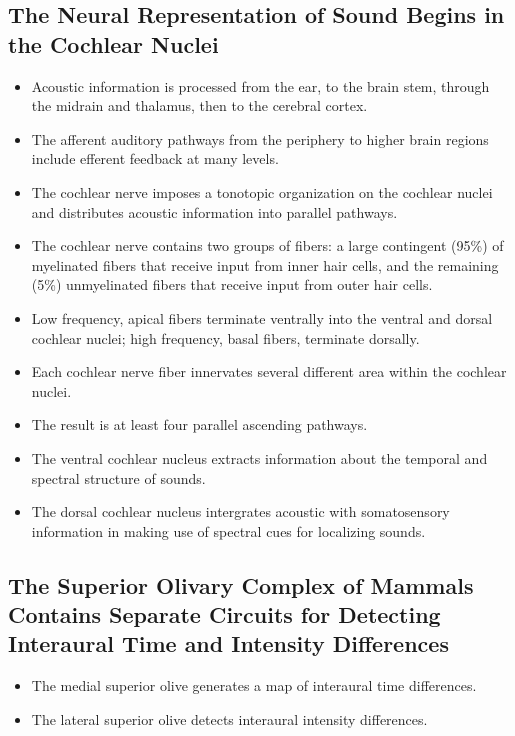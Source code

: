 \documentclass[12pt,a4paper]{article}
\begin{document}
\subsection{The Neural Representation of Sound Begins in the Cochlear Nuclei}
\begin{itemize}
    \item Acoustic information is processed from the ear, to the brain stem, through the midrain and thalamus, then to the cerebral cortex.
    \item The afferent auditory pathways from the periphery to higher brain regions include efferent feedback at many levels.
    \item The cochlear nerve imposes a tonotopic organization on the cochlear nuclei and distributes acoustic information into parallel pathways.
    \item The cochlear nerve contains two groups of fibers: a large contingent (95\%) of myelinated fibers that receive input from inner hair cells, and the remaining (5\%) unmyelinated fibers that receive input from outer hair cells.
    \item Low frequency, apical fibers terminate ventrally into the ventral and dorsal cochlear nuclei; high frequency, basal fibers, terminate dorsally.
    \item Each cochlear nerve fiber innervates several different area within the cochlear nuclei.
    \item The result is at least four parallel ascending pathways.
    \item The ventral cochlear nucleus extracts information about the temporal and spectral structure of sounds.
    \item The dorsal cochlear nucleus intergrates acoustic with somatosensory information in making use of spectral cues for localizing sounds.
\end{itemize}

\subsection{The Superior Olivary Complex of Mammals Contains Separate Circuits for Detecting Interaural Time and Intensity Differences}
\begin{itemize}
    \item The medial superior olive generates a map of interaural time differences.
    \item The lateral superior olive detects interaural intensity differences.
\end{itemize}
\end{document}
